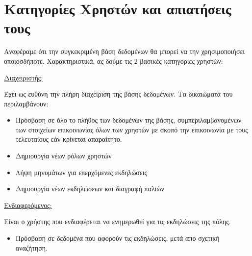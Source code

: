 
\section{Κατηγορίες Χρηστών και απιατήσεις τους}

Αναφέραμε ότι την συγκεκριμένη βάση δεδομένων θα μπορεί να την χρησιμοποιήσει οποιοσδήποτε. Χαρακτηριστικά, ας δούμε τις 2 βασικές κατηγορίες χρηστών:

\underline{Διαχειριστής:}

Έχει ως ευθύνη την πλήρη διαχείριση της βάσης δεδομένων. Τα δικαιώματά
του περιλαμβάνουν:
\begin{itemize}[noitemsep]
\item Πρόσβαση σε όλο το πλήθος των δεδομένων της βάσης,
  συμπεριλαμβανομένων των στοιχείων επικοινωνίας όλων των χρηστών με
  σκοπό την επικοινωνία με τους τελευταίους εάν κρίνεται απαραίτητο.
\item Δημιουργία νέων ρόλων χρηστών
\item Λήψη μηνυμάτων για επερχόμενες εκδηλώσεις
\item Δημιουργία νέων εκδηλώσεων και διαγραφή παλιών
\end{itemize}

\underline{Ενδιαφερόμενος:} %

Είναι ο χρήστης που ενδιαφέρεται να ενημερωθεί για τις εκδηλώσεις της πόλης.
\begin{itemize}[noitemsep]
\item Πρόσβαση σε δεδομένα που αφορούν τις εκδηλώσεις, μετά απο σχετική αναζήτηση.
\end{itemize}

